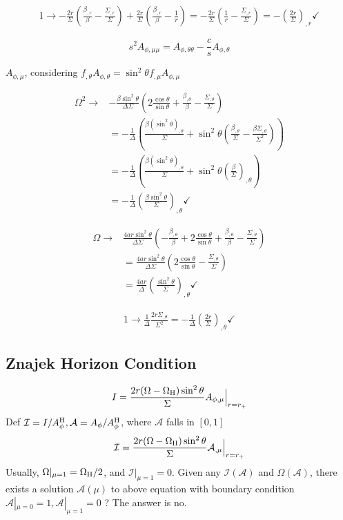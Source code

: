 \documentclass[aps,prd,preprint,groupedaddress]{revtex4-1}
\def\nn{\nonumber}
\def\beq{\begin{equation}}
\def\eeq{\end{equation}}
\def\ct{\cos\theta}
\def\st{\sin\theta}
\def\sst{\sin^2\theta}
\def\Ah{A_{\phi,\theta}}
\def\Ahh{A_{\phi,\theta\theta}}
\def\Am{A_{\phi,\mu}}
\def\Amm{A_{\phi,\mu\mu}}
\def\WH{\Omega_{\rm H}}
\begin{document}
\begin{align}
1 \rightarrow
-\frac{2r}{\Sigma} \left(\frac{\beta_{,r}}{\beta} - \frac{\Sigma_{,r}}{\Sigma} \right)
+\frac{2r}{\Sigma}\left(\frac{\beta_{,r}}{\beta}-\frac{1}{r} \right)
= -\frac{2r}{\Sigma}  \left(\frac{1}{r}-\frac{\Sigma_{,r}}{\Sigma} \right)
= -\left(\frac{2r}{\Sigma} \right)_{,r} \checkmark
\end{align}

\beq
s^2 \Amm = \Ahh - \frac{c}{s} \Ah
\eeq

$\Am$, considering $f_{,\theta} \Ah = \sst f_{,\mu}\Am$

\begin{align}
\Omega^2 \rightarrow
&-\frac{\beta \sst}{\Delta\Sigma}
\left(2\frac{\ct}{\st} + \frac{\beta_{,\theta}}{\beta} -\frac{\Sigma_{,\theta}}{\Sigma}\right)\nn \\
&= -\frac{1}{\Delta}\left(\frac{\beta (\sst)_{,\theta}}{\Sigma}
+\sst (\frac{\beta_{,\theta}}{\Sigma}-\frac{\beta\Sigma_{,\theta}}{\Sigma^2}) \right)\nn \\
&=  -\frac{1}{\Delta}\left(\frac{\beta (\sst)_{,\theta}}{\Sigma}
+\sst (\frac{\beta}{\Sigma})_{,\theta} \right) \nn\\
&= -\frac{1}{\Delta} \left( \frac{\beta\sst}{\Sigma}\right)_{,\theta} \checkmark
\end{align}

\begin{align}
\Omega \rightarrow
&\frac{4ar\sst}{\Delta\Sigma}\left(-\frac{\beta_{,\theta}}{\beta} +
2\frac{\ct}{\st} + \frac{\beta_{,\theta}}{\beta} -\frac{\Sigma_{,\theta}}{\Sigma}\right) \nn\\
&=\frac{4ar\sst}{\Delta\Sigma}\left( 2\frac{\ct}{\st} -\frac{\Sigma_{,\theta}}{\Sigma}\right) \nn\\
&=\frac{4ar}{\Delta}\left( \frac{\sst}{\Sigma}\right)_{,\theta} \checkmark
\end{align}

\begin{align}
1 \rightarrow \frac{1}{\Delta}\frac{2r\Sigma_{,\theta}}{\Sigma^2}
= -\frac{1}{\Delta}\left(\frac{2r}{\Sigma} \right)_{,\theta} \checkmark
\end{align}

\subsection{Znajek Horizon Condition}

\beq
    I = \frac{2r(\Omega-\WH)\sst}{\Sigma} \Am \Big|_{r=r_+}
\eeq
Def $\mathcal I = I / A_\phi^{\rm H}, \mathcal A = A_\phi / A_\phi^{\rm H}$,
where $\mathcal A $ falls in $[0,1]$
\beq
    \mathcal I = \frac{2r(\Omega-\WH)\sst}{\Sigma} \mathcal A_{,\mu}\Big|_{r=r_+}
\eeq
Usually, $\Omega|_{\mu = 1} = \WH/2$, and $\mathcal I|_{\mu = 1} = 0$.
Given any $\mathcal I(\mathcal A)$ and $\Omega(\mathcal A)$,
there exists a solution $\mathcal A(\mu) $ to above equation with boundary condition
$\mathcal A|_{\mu=0} = 1, \mathcal A|_{\mu=1} = 0$ ? The answer is no.
\\
\end{document}
